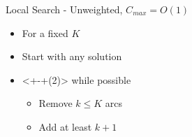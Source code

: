 \begin{frame}{Local Search - Unweighted, $C_{max} = O(1)$}
\begin{itemize}[<+>]
  \item For a fixed $K$
  \item Start with any solution
  \item<+-+(2)> while possible
  	\begin{itemize}
  	  \item Remove $k \leq K$ arcs
  	  \item Add at least $k+1$
	\end{itemize}
\end{itemize}
\end{frame}